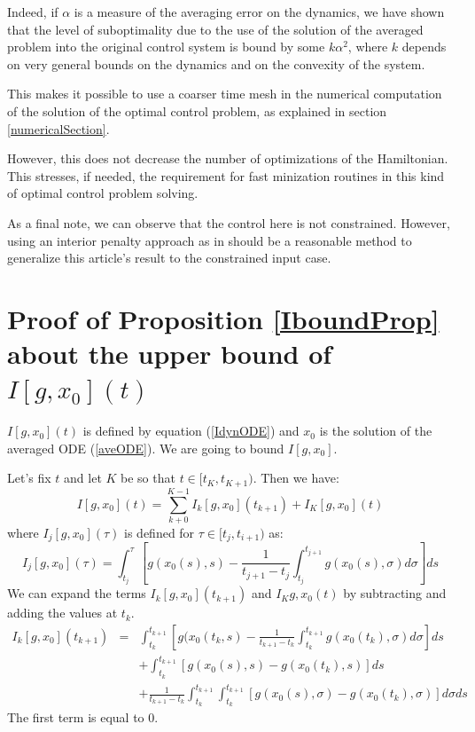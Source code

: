 \documentclass[a4paper,10pt]{article}
\begin{document}
Indeed, if $\alpha$ is a measure of the averaging error on the 
dynamics, we have shown that the level of suboptimality due to the 
use of the solution of the averaged problem into the original control 
system is bound by some $k\alpha^{2}$, where $k$ depends on very 
general bounds on the dynamics and on the convexity of the system.


This makes it possible to use a coarser time mesh in the numerical computation 
of the solution of the optimal control problem, as explained in 
section \ref{numericalSection}.

However, this does not decrease the number of optimizations of the 
Hamiltonian. This stresses, if 
needed, the requirement for fast minization routines in this kind of 
optimal control problem solving.

As a final note, we can observe that the control here is not 
constrained. However, using an interior penalty approach as in 
\cite{maamria} should be a reasonable method to generalize this 
article's result to the constrained input case.


\appendix
\section{Proof of Proposition \ref{IboundProp} about the upper 
bound of $I[g,x_{0}](t)$}\label{proofIboundProp}
$I[g,x_{0}](t)$ is defined by equation (\ref{IdynODE}) and $x_{0}$ is 
the solution of the averaged ODE (\ref{aveODE}). We are going to 
bound $I[g,x_{0}]$.

Let's fix $t$ and let $K$ be so that $t \in [t_{K},t_{K+1})$. Then we 
have:
\begin{equation}
    I[g,x_{0}](t) = \sum_{k+0}^{K-1}I_{k}[g,x_{0}](t_{k+1}) + 
    I_{K}[g,x_{0}](t)
    \label{decompI}
\end{equation}
where $I_{j}[g,x_{0}](\tau)$ is defined for $\tau \in [t_{j},t_{i+1})$ as:
\[
        I_{j}[g,x_{0}](\tau) =
           \int_{t_{j}}^{\tau}
              \left[
         g(x_{0}(s),s)
         - \frac{1}{t_{j+1}-t_{j}}
         \int_{t_{j}}^{t_{j+1}}g(x_{0}(s),\sigma)d \sigma
         \right] ds
\]
We can expand the terms $I_{k}[g,x_{0}](t_{k+1})$ and 
$I_{K}g,x_{0}(t)$ by 
subtracting and adding the values at $t_{k}$.
\begin{eqnarray*}
    I_{k}[g,x_{0}](t_{k+1}) & = &
    \int_{t_{k}}^{t_{k+1}}  \left[ g(x_{0}(t_{k},s) 
    - \frac{1}{t_{k+1}-t_{k}} \int_{t_{k}}^{t_{k+1}} 
    g(x_{0}(t_{k}), \sigma ) d \sigma \right] ds 
      \\ & &
    +\int_{t_{k}}^{t_{k+1}} [g(x_{0}(s),s) -  g(x_{0}(t_{k}),s)] ds 
     \\ & &
    + \frac{1}{t_{k+1}-t_{k}} \int_{t_{k}}^{t_{k+1}} \int_{t_{k}}^{t_{k+1}}
    [g(x_{0}(s),\sigma) 
    - g(x_{0}(t_{k}),\sigma)] d \sigma ds
\end{eqnarray*}
The first term is equal to $0$. 
\end{document}
